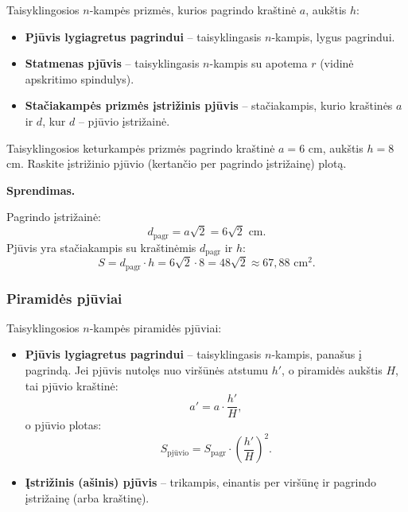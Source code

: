 Taisyklingosios $n$-kampės prizmės, kurios pagrindo kraštinė $a$, aukštis $h$:

\begin{itemize}
    \item \textbf{Pjūvis lygiagretus pagrindui} – taisyklingasis $n$-kampis, lygus pagrindui.
    \item \textbf{Statmenas pjūvis} – taisyklingasis $n$-kampis su apotema $r$ (vidinė apskritimo spindulys).
    \item \textbf{Stačiakampės prizmės įstrižinis pjūvis} – stačiakampis, kurio kraštinės $a$ ir $d$, kur $d$ – pjūvio įstrižainė.
\end{itemize}

\begin{example}
Taisyklingosios keturkampės prizmės pagrindo kraštinė $a = 6$ cm, aukštis $h = 8$ cm. Raskite įstrižinio pjūvio (kertančio per pagrindo įstrižainę) plotą.

\textbf{Sprendimas.}

Pagrindo įstrižainė:
\[
d_{\text{pagr}} = a\sqrt{2} = 6\sqrt{2} \text{ cm}.
\]
Pjūvis yra stačiakampis su kraštinėmis $d_{\text{pagr}}$ ir $h$:
\[
S = d_{\text{pagr}} \cdot h = 6\sqrt{2} \cdot 8 = 48\sqrt{2} \approx 67{,}88 \text{ cm}^2.
\]
\end{example}

\subsubsection{Piramidės pjūviai}

Taisyklingosios $n$-kampės piramidės pjūviai:

\begin{itemize}
    \item \textbf{Pjūvis lygiagretus pagrindui} – taisyklingasis $n$-kampis, panašus į pagrindą. Jei pjūvis nutolęs nuo viršūnės atstumu $h'$, o piramidės aukštis $H$, tai pjūvio kraštinė:
    \[
    a' = a \cdot \frac{h'}{H},
    \]
    o pjūvio plotas:
    \[
    S_{\text{pjūvio}} = S_{\text{pagr}} \cdot \left(\frac{h'}{H}\right)^2.
    \]
    \item \textbf{Įstrižinis (ašinis) pjūvis} – trikampis, einantis per viršūnę ir pagrindo įstrižainę (arba kraštinę).
\end{itemize}


